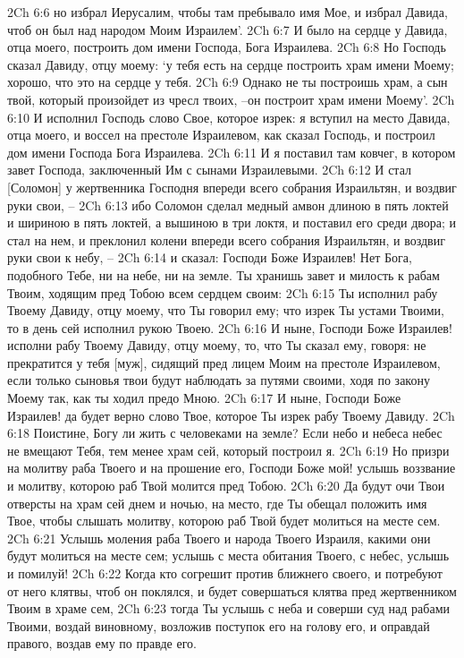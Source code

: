 2Ch 6:6  но избрал Иерусалим, чтобы там пребывало имя Мое, и избрал Давида, чтоб он был над народом Моим Израилем'.
2Ch 6:7  И было на сердце у Давида, отца моего, построить дом имени Господа, Бога Израилева.
2Ch 6:8  Но Господь сказал Давиду, отцу моему: `у тебя есть на сердце построить храм имени Моему; хорошо, что это на сердце у тебя.
2Ch 6:9  Однако не ты построишь храм, а сын твой, который произойдет из чресл твоих, --он построит храм имени Моему'.
2Ch 6:10  И исполнил Господь слово Свое, которое изрек: я вступил на место Давида, отца моего, и воссел на престоле Израилевом, как сказал Господь, и построил дом имени Господа Бога Израилева.
2Ch 6:11  И я поставил там ковчег, в котором завет Господа, заключенный Им с сынами Израилевыми.
2Ch 6:12  И стал [Соломон] у жертвенника Господня впереди всего собрания Израильтян, и воздвиг руки свои, --
2Ch 6:13  ибо Соломон сделал медный амвон длиною в пять локтей и шириною в пять локтей, а вышиною в три локтя, и поставил его среди двора; и стал на нем, и преклонил колени впереди всего собрания Израильтян, и воздвиг руки свои к небу, --
2Ch 6:14  и сказал: Господи Боже Израилев! Нет Бога, подобного Тебе, ни на небе, ни на земле. Ты хранишь завет и милость к рабам Твоим, ходящим пред Тобою всем сердцем своим:
2Ch 6:15  Ты исполнил рабу Твоему Давиду, отцу моему, что Ты говорил ему; что изрек Ты устами Твоими, то в день сей исполнил рукою Твоею.
2Ch 6:16  И ныне, Господи Боже Израилев! исполни рабу Твоему Давиду, отцу моему, то, что Ты сказал ему, говоря: не прекратится у тебя [муж], сидящий пред лицем Моим на престоле Израилевом, если только сыновья твои будут наблюдать за путями своими, ходя по закону Моему так, как ты ходил предо Мною.
2Ch 6:17  И ныне, Господи Боже Израилев! да будет верно слово Твое, которое Ты изрек рабу Твоему Давиду.
2Ch 6:18  Поистине, Богу ли жить с человеками на земле? Если небо и небеса небес не вмещают Тебя, тем менее храм сей, который построил я.
2Ch 6:19  Но призри на молитву раба Твоего и на прошение его, Господи Боже мой! услышь воззвание и молитву, которою раб Твой молится пред Тобою.
2Ch 6:20  Да будут очи Твои отверсты на храм сей днем и ночью, на место, где Ты обещал положить имя Твое, чтобы слышать молитву, которою раб Твой будет молиться на месте сем.
2Ch 6:21  Услышь моления раба Твоего и народа Твоего Израиля, какими они будут молиться на месте сем; услышь с места обитания Твоего, с небес, услышь и помилуй!
2Ch 6:22  Когда кто согрешит против ближнего своего, и потребуют от него клятвы, чтоб он поклялся, и будет совершаться клятва пред жертвенником Твоим в храме сем,
2Ch 6:23  тогда Ты услышь с неба и соверши суд над рабами Твоими, воздай виновному, возложив поступок его на голову его, и оправдай правого, воздав ему по правде его.
